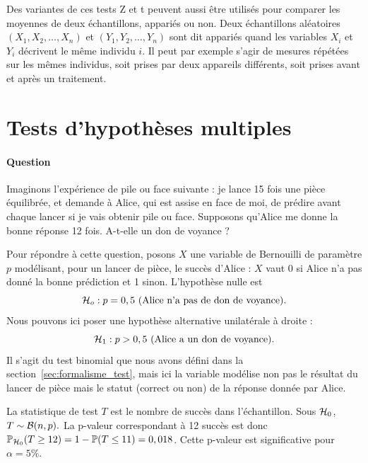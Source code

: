 Des variantes de ces tests Z et t peuvent aussi être utilisés pour comparer les
moyennes de deux échantillons, appariés ou non. Deux échantillons aléatoires
$(X_1, X_2, \dots, X_n)$ et $(Y_1, Y_2, \dots, Y_n)$ sont dit appariés quand
les variables $X_i$ et $Y_i$ décrivent le même individu $i$. Il peut par
exemple s'agir de mesures répétées sur les mêmes individus, soit prises par
deux appareils différents, soit prises avant et après un traitement.



\section{Tests d'hypothèses multiples}
\label{sec:mht}
\paragraph{Question} Imaginons l'expérience de pile ou face suivante : je lance
15 fois une pièce équilibrée, et demande à Alice, qui est assise en face de
moi, de prédire avant chaque lancer si je vais obtenir pile ou face. Supposons
qu'Alice me donne la bonne réponse 12 fois. A-t-elle un don de
voyance ?
\begin{answer}
  Pour répondre à cette question, posons $X$ une variable de Bernouilli de
  paramètre $p$ modélisant, pour un lancer de pièce, le succès d'Alice :
  $X$ vaut 0 si Alice n'a pas donné la bonne prédiction et 1
  sinon. L'hypothèse nulle est
  \[
    \mathcal{H}_o : p = 0,5 \text{ (Alice n'a pas de don de voyance)}.
  \]
  Nous pouvons ici poser une hypothèse alternative unilatérale à droite :
  \[
    \mathcal{H}_1 : p > 0,5 \text{ (Alice a un don de voyance)}.
  \]
  Il s'agit du test binomial que nous avons défini dans la
  section~\ref{sec:formalisme_test}, mais ici la variable modélise non pas le
  résultat du lancer de pièce mais le statut (correct ou non) de la réponse
  donnée par Alice.

  La statistique de test $T$ est le nombre de succès dans l'échantillon. Sous
  $\mathcal{H}_0$, $T \sim \mathcal{B}(n, p).$ La p-valeur correspondant à 12 succès est donc
  $\mathbb{P}_{\mathcal{H}_0}(T \geq 12) = 1 - \mathbb{P}(T \leq 11) = 0,018$. Cette p-valeur est
  significative pour $\alpha = 5\%$.
\end{answer}

